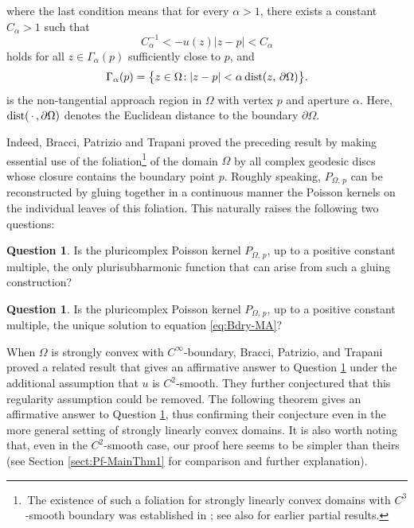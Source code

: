 \documentclass[12pt,a4paper]{amsart}
\numberwithin{equation}{section}
\theoremstyle{definition}
\newtheorem{Qx}[thmx]{Question}
\begin{document}
where the last condition means that for every $\alpha>1$, there exists a constant $C_{\alpha}>1$ such that
   $$
   C_{\alpha}^{-1} <-u(z)|z-p|<C_{\alpha}
   $$
holds for all $z\in \Gamma_{\alpha}(p)$ sufficiently close to $p$, and
   $$
   \Gamma_{\alpha}(p)=\big\{z\in\Omega\!: |z-p|<\alpha\, {\rm dist}(z,\, \partial\Omega)\big\}.
   $$
is the non-tangential approach region in $\Omega$ with vertex $p$ and aperture $\alpha$. Here, ${\rm dist}(\,\cdot\,,\partial\Omega)$ denotes the Euclidean distance to the boundary $\partial\Omega$.

Indeed, Bracci, Patrizio and Trapani proved the preceding result by making essential use of the foliation\footnote{\,The existence of such a foliation for strongly linearly convex domains with $C^3$-smooth boundary was established in \cite{Huang-Wang22}; see also \cite{Chang--Hu--Lee88} for earlier partial results.} of the domain $\Omega$ by all complex geodesic discs whose closure contains the boundary point $p$. Roughly speaking, $P_{\Omega,\, p}$ can be reconstructed by gluing together in a continuous manner the Poisson kernels on the individual leaves of this foliation. This naturally raises the following two questions:

\begin{Qx}\label{Q:uniqueness1}
Is the pluricomplex Poisson kernel $P_{\Omega,\, p}$, up to a positive constant multiple, the only plurisubharmonic function that can arise from such a gluing construction?
\end{Qx}

\begin{Qx}\label{Q:uniqueness2}
Is the pluricomplex Poisson kernel $P_{\Omega,\, p}$, up to a positive constant multiple, the unique solution to equation \eqref{eq:Bdry-MA}?
\end{Qx}



When $\Omega$ is strongly convex with $C^\infty$-boundary, Bracci, Patrizio, and Trapani \cite{Bracci-Trans09} proved a related result that gives an affirmative answer to Question \ref{Q:uniqueness1} under the additional assumption that $u$ is $C^2$-smooth. They further conjectured that this regularity assumption could be removed. The following theorem gives an affirmative answer to Question \ref{Q:uniqueness1}, thus confirming their conjecture even in the more general setting of strongly linearly convex domains. It is also worth noting that, even in the $C^2$-smooth case, our proof here seems to be simpler than theirs (see Section \ref{sect:Pf-MainThm1} for comparison and further explanation).
\end{document}
